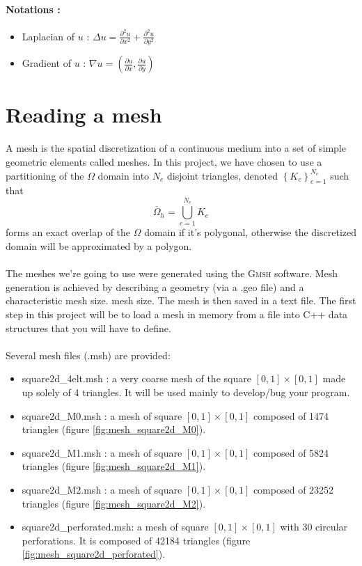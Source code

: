 \documentclass[english,10pt,a4paper]{article}
\begin{document}
\paragraph{Notations :}
\begin{itemize}
\item Laplacian of $u$ : $\Delta u = \frac{\partial^2 u}{\partial x^2} + \frac{\partial^2 u}{\partial y^2}$
\item Gradient of $u$ : $\nabla u = ( \frac{\partial u}{\partial x}, \frac{\partial u}{\partial y} )$
\end{itemize}


\section{Reading a mesh}
A mesh is the spatial discretization of a continuous medium into a set of simple geometric elements called meshes. In this project, we have chosen
to use a partitioning of the $\Omega$ domain into $N_e$ disjoint triangles, denoted $\left\{ K_e \right\}_{e=1}^{N_e}$ such that
\begin{equation*}
\overline{\Omega}_h = \bigcup_{e=1}^{N_e} K_e
\end{equation*}
forms an exact overlap of the $\Omega$ domain if it's polygonal, otherwise the discretized domain will be approximated by a polygon.

\paragraph{}
The meshes we're going to use were generated using the \textsc{Gmsh} software. Mesh generation is achieved by describing a geometry (via a .geo file) and a characteristic mesh size.
mesh size. The mesh is then saved in a text file. 
The first step in this project will be to load a mesh in memory from a file into C++ data structures that you will have to define.

\paragraph{}
Several mesh files (.msh) are provided:
\begin{itemize}
\item square2d\_4elt.msh : a very coarse mesh of the square $[0,1] \times [0,1]$ made up solely of 4 triangles. It will be used mainly to develop/bug your program.
\item square2d\_M0.msh : a mesh of square $[0,1] \times [0,1]$ composed of 1474 triangles (figure \ref{fig:mesh_square2d_M0}).
\item square2d\_M1.msh : a mesh of square $[0,1] \times [0,1]$ composed of 5824 triangles (figure \ref{fig:mesh_square2d_M1}).
\item square2d\_M2.msh : a mesh of square $[0,1] \times [0,1]$ composed of 23252 triangles (figure \ref{fig:mesh_square2d_M2}).
\item square2d\_perforated.msh: a mesh of square $[0,1] \times [0,1]$ with 30 circular perforations. It is composed of 42184 triangles (figure \ref{fig:mesh_square2d_perforated}).
\end{itemize}
\end{document}
